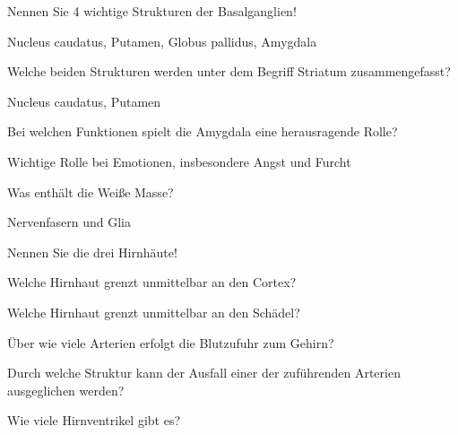 \documentclass[10pt, a4paper]{exam}
\begin{document}
\begin{questions}
  \question Nennen Sie 4 wichtige Strukturen der Basalganglien!
  \begin{solution}
    Nucleus caudatus, Putamen, Globus pallidus, Amygdala
  \end{solution}

  \question Welche beiden Strukturen werden unter dem Begriff Striatum zusammengefasst?
  \begin{solution}
    Nucleus caudatus, Putamen
  \end{solution}

  \question Bei welchen Funktionen spielt die Amygdala eine herausragende Rolle?
  \begin{solution}
    Wichtige Rolle bei Emotionen, insbesondere Angst und Furcht
  \end{solution}

  \question Was enthält die Weiße Masse?
  \begin{solution}
    Nervenfasern und Glia
  \end{solution}

  \question Nennen Sie die drei Hirnhäute!
  \begin{solution}

  \end{solution}

  \question Welche Hirnhaut grenzt unmittelbar an den Cortex?
  \begin{solution}

  \end{solution}

  \question Welche Hirnhaut grenzt unmittelbar an den Schädel?
  \begin{solution}

  \end{solution}

  \question Über wie viele Arterien erfolgt die Blutzufuhr zum Gehirn?
  \begin{solution}

  \end{solution}

  \question Durch welche Struktur kann der Ausfall einer der zuführenden Arterien ausgeglichen werden?
  \begin{solution}

  \end{solution}

  \question Wie viele Hirnventrikel gibt es?
  \begin{solution}

  \end{solution}


\end{questions}
\end{document}
